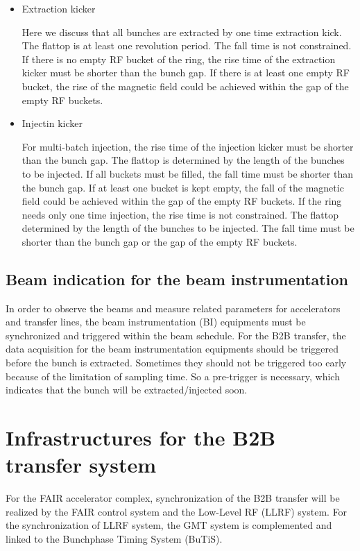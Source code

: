 \begin{itemize}
	\item Extraction kicker
		
Here we discuss that all bunches are extracted by one time extraction kick. The flattop is at least one revolution period. The fall time is not constrained. If there is no empty RF bucket of the ring, the rise time of the extraction kicker must be shorter than the bunch gap. If there is at least one empty RF bucket, the rise of the magnetic field could be achieved within the gap of the empty RF buckets. 

	\item Injectin kicker

For multi-batch injection, the rise time of the injection kicker must be shorter than the bunch gap. The flattop is determined by the length of the bunches to be injected. If all buckets must be filled, the fall time must be shorter than the bunch gap. If at least one bucket is kept empty, the fall of the magnetic field could be achieved within the gap of the empty RF buckets. If the ring needs only one time injection, the rise time is not constrained. The flattop determined by the length of the bunches to be injected. The fall time must be shorter than the bunch gap or the gap of the empty RF buckets. 

\end{itemize}

\subsection{Beam indication for the beam instrumentation}
In order to observe the beams and measure related parameters for accelerators and transfer lines, the beam instrumentation (\gls{BI}) equipments must be synchronized and triggered within the beam schedule. For the B2B transfer, the data acquisition for the beam instrumentation equipments should be triggered before the bunch is extracted. Sometimes they should not be triggered too early because of the limitation of sampling time. So a pre-trigger is necessary, which indicates that the bunch will be extracted/injected soon. 

\section{Infrastructures for the B2B transfer system}
For the FAIR accelerator complex, synchronization of the B2B transfer will be
realized by the FAIR control system and the Low-Level RF
(LLRF) system. For the synchronization of LLRF system, the GMT system is complemented and linked to the Bunchphase Timing System (BuTiS). 
